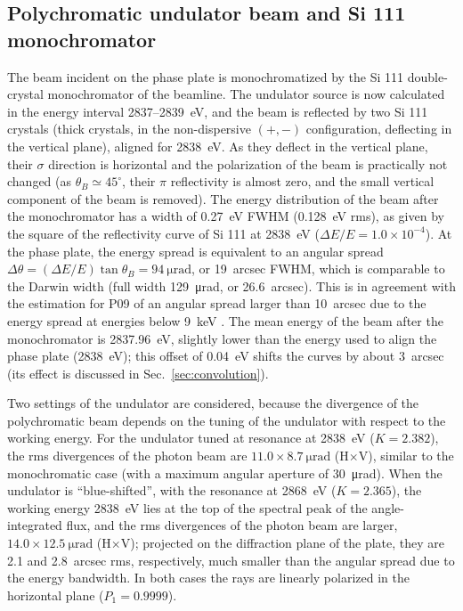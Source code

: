\documentclass{iucr}
\begin{document}
\subsection{Polychromatic undulator beam and Si 111 monochromator}
\label{sec:undulator_poly}

The beam incident on the phase plate is monochromatized by the Si 111 double-crystal monochromator of the beamline. The undulator source is now calculated in the energy interval 2837--2839~eV, and the beam is reflected by two Si 111 crystals (thick crystals, in the non-dispersive $(+,-)$ configuration, deflecting in the vertical plane), aligned for 2838~eV. As they deflect in the vertical plane, their $\sigma$ direction is horizontal and the polarization of the beam is practically not changed (as $\theta_B\simeq45^\circ$, their $\pi$ reflectivity is almost zero, and the small vertical component of the beam is removed). The energy distribution of the beam after the monochromator has a width of 0.27~eV FWHM (0.128~eV rms), as given by the square of the reflectivity curve of Si 111 at 2838~eV ($\Delta E/E=1.0\times10^{-4}$). At the phase plate, the energy spread is equivalent to an angular spread $\Delta\theta=(\Delta E/E)\tan\theta_B=\SI{94}{\micro\radian}$, or 19~arcsec FWHM, which is comparable to the Darwin width (full width \SI{129}{\micro\radian}, or 26.6~arcsec). This is in agreement with the estimation for P09 of an angular spread larger than 10~arcsec due to the energy spread at energies below 9~keV \cite{Strempfer2013}. The mean energy of the beam after the monochromator is 2837.96~eV, slightly lower than the energy used to align the phase plate (2838~eV); this offset of 0.04~eV shifts the curves by about 3~arcsec (its effect is discussed in Sec.~\ref{sec:convolution}).

Two settings of the undulator are considered, because the divergence of the polychromatic beam depends on the tuning of the undulator with respect to the working energy. For the undulator tuned at resonance at 2838~eV ($K=2.382$), the rms divergences of the photon beam are $11.0\times\SI{8.7}{\micro\radian}$ (H$\times$V), similar to the monochromatic case (with a maximum angular aperture of \SI{30}{\micro\radian}). When the undulator is ``blue-shifted'', with the resonance at 2868~eV ($K=2.365$), the working energy 2838~eV lies at the top of the spectral peak of the angle-integrated flux, and the rms divergences of the photon beam are larger, $14.0\times\SI{12.5}{\micro\radian}$ (H$\times$V); projected on the diffraction plane of the plate, they are 2.1 and 2.8~arcsec rms, respectively, much smaller than the angular spread due to the energy bandwidth. In both cases the rays are linearly polarized in the horizontal plane ($P_1=0.9999$).
\end{document}
